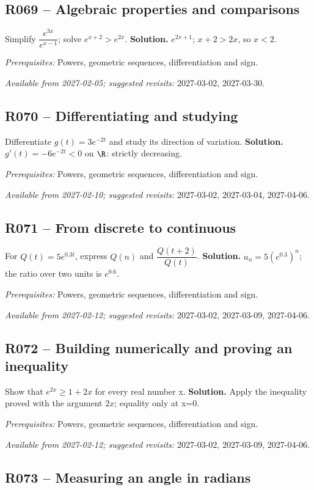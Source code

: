 \subsection*{R069 -- Algebraic properties and comparisons}\label{R069}
Simplify $\dfrac{e^{3x}}{e^{x-1}}$; solve $e^{x+2}>e^{2x}$.
\ifmxteacher\textbf{Solution.} $e^{2x+1}$; $x+2>2x$, so $x<2$.\par\textit{Prerequisites:} Powers, geometric sequences, differentiation and sign.\par\textit{Available from 2027-02-05; suggested revisits:} 2027-03-02, 2027-03-30.\fi
{}\subsection*{R070 -- Differentiating and studying}\label{R070}
Differentiate $g(t)=3e^{-2t}$ and study its direction of variation.
\ifmxteacher\textbf{Solution.} $g\prime(t)=-6e^{-2t}<0$ on $\R$: strictly decreasing.\par\textit{Prerequisites:} Powers, geometric sequences, differentiation and sign.\par\textit{Available from 2027-02-10; suggested revisits:} 2027-03-02, 2027-03-04, 2027-04-06.\fi
{}\subsection*{R071 -- From discrete to continuous}\label{R071}
For $Q(t)=5e^{\num{0,3}t}$, express $Q(n)$ and $\dfrac{Q(t+2)}{Q(t)}$.
\ifmxteacher\textbf{Solution.} $u_n=5(e^{\num{0,3}})^n$; the ratio over two units is $e^{\num{0,6}}$.\par\textit{Prerequisites:} Powers, geometric sequences, differentiation and sign.\par\textit{Available from 2027-02-12; suggested revisits:} 2027-03-02, 2027-03-09, 2027-04-06.\fi
{}\subsection*{R072 -- Building numerically and proving an inequality}\label{R072}
Show that $e^{2x}\geq1+2x$ for every real number x.
\ifmxteacher\textbf{Solution.} Apply the inequality proved with the argument $2x$; equality only at x=0.\par\textit{Prerequisites:} Powers, geometric sequences, differentiation and sign.\par\textit{Available from 2027-02-12; suggested revisits:} 2027-03-02, 2027-03-09, 2027-04-06.\fi
{}\subsection*{R073 -- Measuring an angle in radians}\label{R073}
